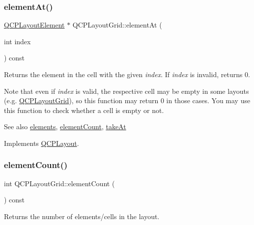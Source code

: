 \subsubsection{\texorpdfstring{element\+At()}{elementAt()}}
{\footnotesize\ttfamily \mbox{\hyperlink{class_q_c_p_layout_element}{Q\+C\+P\+Layout\+Element}} $\ast$ Q\+C\+P\+Layout\+Grid\+::element\+At (\begin{DoxyParamCaption}\item[{int}]{index }\end{DoxyParamCaption}) const\hspace{0.3cm}{\ttfamily [virtual]}}

Returns the element in the cell with the given {\itshape index}. If {\itshape index} is invalid, returns 0.

Note that even if {\itshape index} is valid, the respective cell may be empty in some layouts (e.\+g. \mbox{\hyperlink{class_q_c_p_layout_grid}{Q\+C\+P\+Layout\+Grid}}), so this function may return 0 in those cases. You may use this function to check whether a cell is empty or not.

\begin{DoxySeeAlso}{See also}
\mbox{\hyperlink{class_q_c_p_layout_grid_a20a745d013de4c89cf5de8004a5a36f7}{elements}}, \mbox{\hyperlink{class_q_c_p_layout_grid_a77f194843d037e0da6d5f3170acdf3a2}{element\+Count}}, \mbox{\hyperlink{class_q_c_p_layout_grid_acc1277394ff8a6432e111ff9463e6375}{take\+At}} 
\end{DoxySeeAlso}


Implements \mbox{\hyperlink{class_q_c_p_layout_afa73ca7d859f8a3ee5c73c9b353d2a56}{Q\+C\+P\+Layout}}.

\mbox{\label{class_q_c_p_layout_grid_a77f194843d037e0da6d5f3170acdf3a2}} 
\subsubsection{\texorpdfstring{element\+Count()}{elementCount()}}
{\footnotesize\ttfamily int Q\+C\+P\+Layout\+Grid\+::element\+Count (\begin{DoxyParamCaption}{ }\end{DoxyParamCaption}) const\hspace{0.3cm}{\ttfamily [virtual]}}

Returns the number of elements/cells in the layout.

